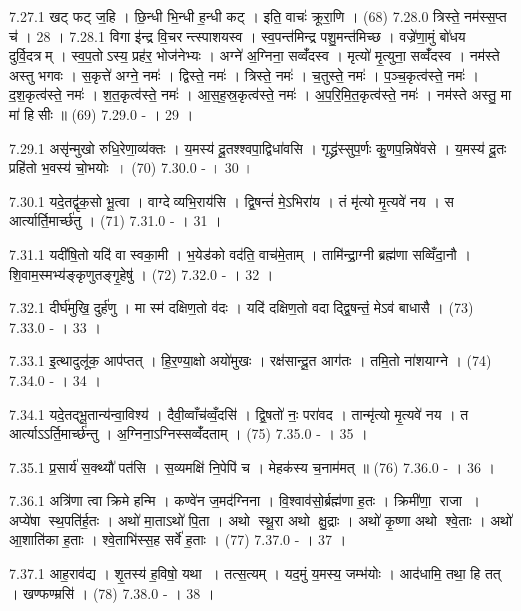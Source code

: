 7.27.1
खट् फट् ज॒हि । छि॒न्धी भि॒न्धी ह॒न्धी कट् । इति॒ वाचः॑ क्रूरा॒णि । (68)
7.28.0
त्रिस्ते॒ नम॑स्स॒प्त च॑ । 28 ।
7.28.1
विगा इ॑न्द्र वि॒चरन्त्स्पाशयस्व । स्व॒पन्त॑मिन्द्र पशु॒मन्त॑मिच्छ । वज्रे॑णा॒मुं बो॑धय दुर्वि॒दत्रम् । स्व॒प॒तोऽस्य॒ प्रह॑र॒ भोज॑नेभ्यः । अग्ने॑ अ॒ग्निना॒ सव्वँ॑दस्व । मृत्यो॑ मृ॒त्युना॒ सव्वँ॑दस्व । नम॑स्ते अस्तु भगवः । स॒कृत्ते॑ अग्ने॒ नमः॑ । द्विस्ते॒ नमः॑ । त्रिस्ते॒ नमः॑ । च॒तुस्ते॒ नमः॑ । प॒ञ्च॒कृत्व॑स्ते॒ नमः॑ । द॒श॒कृत्व॑स्ते॒ नमः॑ । श॒त॒कृत्व॑स्ते॒ नमः॑ । आ॒स॒ह॒स्र॒कृत्व॑स्ते॒ नमः॑ । अ॒प॒रि॒मि॒त॒कृत्व॑स्ते॒ नमः॑ । नम॑स्ते अस्तु॒ मा मा॑ हिसीः ॥ (69)
7.29.0
- । 29 ।
\anuvakamend

7.29.1
असृ॑न्मुखो रुधि॒रेणा॒व्य॑क्तः । य॒मस्य॑ दू॒तश्श्वपा॒द्विधा॑वसि । गृद्ध्र॑स्सुप॒र्णः कु॒णप॒न्निषे॑वसे । य॒मस्य॑ दू॒तः प्रहि॑तो भ॒वस्य॑ चो॒भयोः । (70)
7.30.0
- । 30 ।
\anuvakamend

7.30.1
यदे॒तद्वृ॑क॒सो भू॒त्वा । वाग्देव्यभि॒राय॑सि । द्वि॒षन्तं॑ मे॒ऽभिरा॑य । तं मृ॑त्यो मृ॒त्यवे॑ नय । स आर्त्यार्ति॒मार्च्छ॑तु । (71)
7.31.0
- । 31 ।
\anuvakamend

7.31.1
यदी॑षि॒तो यदि॑ वा स्वका॒मी । भ॒येड॑को वद॑ति॒ वाच॑मे॒ताम् । तामि॑न्द्रा॒ग्नी ब्रह्म॑णा सव्विँदा॒नौ । शि॒वाम॒स्मभ्य॑ङ्कृणुतङ्गृ॒हेषु॑ । (72)
7.32.0
- । 32 ।
\anuvakamend

7.32.1
दीर्घ॑मुखि॒ दुर्\mbox{}ह॑णु । मा स्म॑ दक्षिण॒तो व॑दः । यदि॑ दक्षिण॒तो वदाद्द्वि॒षन्तं॒ मेऽव॑ बाधासै । (73)
7.33.0
- । 33 ।
\anuvakamend

7.33.1
इ॒त्थादुलू॑क॒ आप॑प्तत् । हि॒र॒ण्या॒क्षो अयो॑मुखः । रक्ष॑सान्दू॒त आग॑तः । तमि॒तो ना॑शयाग्ने । (74)
7.34.0
- । 34 ।
\anuvakamend

7.34.1
यदे॒तद्भू॒तान्य॑न्वा॒विश्य॑ । दैवी॒व्वाँच॑व्वँ॒दसि॑ । द्वि॒षतो॑ नः॒ परा॑वद । तान्मृ॑त्यो मृ॒त्यवे॑ नय । त आर्त्याऽऽर्ति॒मार्च्छ॑न्तु । अ॒ग्निना॒ऽग्निस्सव्वँ॑दताम् । (75)
7.35.0
- । 35 ।
\anuvakamend

7.35.1
प्र॒सार्य॑ स॒क्थ्यौ॑ पत॑सि । स॒व्यमक्षि॑ नि॒पेपि॑ च । मेहक॑स्य च॒नाम॑मत् ॥ (76)
7.36.0
- । 36 ।
\anuvakamend

7.36.1
अत्रि॑णा त्वा क्रिमे हन्मि । कण्वे॑न ज॒मद॑ग्निना । वि॒श्वाव॑सो॒र्ब्रह्म॑णा ह॒तः । क्रिमी॑णा॒ राजा । अप्ये॑षा स्थ॒पति॑र्ह॒तः । अथो॑ मा॒ताऽथो॑ पि॒ता । अथो स्थू॒रा अथो क्षु॒द्राः । अथो॑ कृ॒ष्णा अथो श्वे॒ताः । अथो॑ आ॒शाति॑का ह॒ताः । श्वे॒ताभि॑स्स॒ह सर्वे॑ ह॒ताः । (77)
7.37.0
- । 37 ।
\anuvakamend

7.37.1
आह॒राव॑द्य । शृ॒तस्य॑ ह॒विषो॒ यथा । तत्स॒त्यम् । यद॒मुं य॒मस्य॒ जम्भ॑योः । आद॑धामि॒ तथा॒ हि तत् । खण्फण्म्रसि॑ । (78)
7.38.0
- । 38 ।
\anuvakamend

